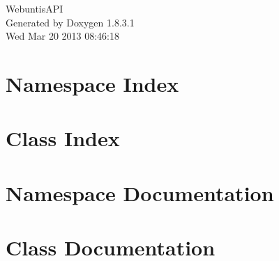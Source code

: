 \documentclass{book}
\begin{document}
\hypersetup{pageanchor=false,citecolor=blue}
\begin{titlepage}
\vspace*{7cm}
\begin{center}
{\Large Webuntis\-A\-P\-I }\\
\vspace*{1cm}
{\large Generated by Doxygen 1.8.3.1}\\
\vspace*{0.5cm}
{\small Wed Mar 20 2013 08:46:18}\\
\end{center}
\end{titlepage}
\clearemptydoublepage
{}
\tableofcontents
\clearemptydoublepage
{}
\hypersetup{pageanchor=true,citecolor=blue}
\chapter{Namespace Index}

\chapter{Class Index}

\chapter{Namespace Documentation}


\chapter{Class Documentation}









\printindex
\end{document}
